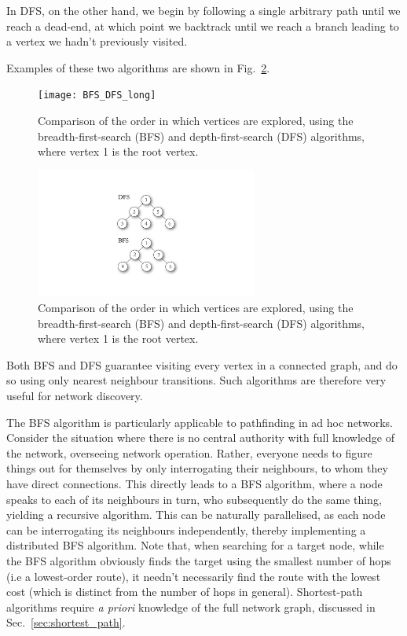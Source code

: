 In DFS, on the other hand, we begin by following a single arbitrary path until we reach a dead-end, at which point we backtrack until we reach a branch leading to a vertex we hadn't previously visited.

Examples of these two algorithms are shown in Fig.~\ref{fig:BFS_DFS}.

\pubmode
	\begin{figure}[!htbp]
	\texttt{[image: BFS\_DFS\_long]}
	\captionspacefig \caption{Comparison of the order in which vertices are explored, using the breadth-first-search (BFS) and depth-first-search (DFS) algorithms, where vertex 1 is the root vertex.} \label{fig:BFS_DFS}
	\end{figure}
\else
	\begin{figure}[!htbp]
	\includegraphics[clip=true, width=0.65\textwidth]{BFS_DFS}
	\captionspacefig \caption{Comparison of the order in which vertices are explored, using the breadth-first-search (BFS) and depth-first-search (DFS) algorithms, where vertex 1 is the root vertex.} \label{fig:BFS_DFS}
	\end{figure}
\fi

Both BFS and DFS guarantee visiting every vertex in a connected graph, and do so using only nearest neighbour transitions. Such algorithms are therefore very useful for network discovery.

The BFS algorithm is particularly applicable to pathfinding in ad hoc networks. Consider the situation where there is no central authority with full knowledge of the network, overseeing network operation. Rather, everyone needs to figure things out for themselves by only interrogating their neighbours, to whom they have direct connections. This directly leads to a BFS algorithm, where a node speaks to each of its neighbours in turn, who subsequently do the same thing, yielding a recursive algorithm. This can be naturally parallelised, as each node can be interrogating its neighbours independently, thereby implementing a distributed BFS algorithm. Note that, when searching for a target node, while the BFS algorithm obviously finds the target using the smallest number of hops (i.e a lowest-order route), it needn't necessarily find the route with the lowest cost (which is distinct from the number of hops in general). Shortest-path algorithms require \textit{a priori} knowledge of the full network graph, discussed in Sec.~\ref{sec:shortest_path}.

